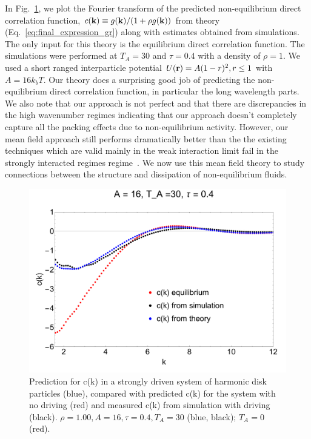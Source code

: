 \documentclass[amsmath,preprintnumbers,10pt,nofootinbib,prl,twocolumn]{revtex4-1}
\begin{document}
In Fig.~\ref{Fig:1}, we plot the Fourier transform of the predicted non-equilibrium direct correlation function, $c({\bf k})\equiv g({\bf k})/(1+\rho g({\bf k}))$ from theory (Eq.~\ref{eq:final_expression_gr}) along with estimates obtained from simulations. The only input for this theory is the equilibrium direct correlation function. The simulations were performed at $T_A=30$ and $\tau=0.4$ with a density of $\rho=1$. We used a short ranged interparticle potential $U({\bf r})=A (1- r)^2, r\leq 1$ with $A=16 k_b T$. Our theory does a surprising good job of predicting the non-equilibrium direct correlation function, in particular the long wavelength parts. We also note that our approach is not perfect and that there are discrepancies in the high wavenumber regimes indicating that our approach doesn't completely capture all the packing effects due to non-equilibrium activity. However, our mean field approach still performs dramatically better than the the existing techniques which are valid mainly in the weak interaction limit fail in the strongly interacted regimes regime~\cite{Dean_1996,Demery2011}. We now use this mean field theory to study connections between the structure and dissipation of non-equilibrium fluids. 
\begin{figure}
    \centering
    \includegraphics[scale=0.25, clip=True]{Ck_A16_T30_U0.4.pdf}
    \caption{Prediction for c(k) in a strongly driven system of harmonic disk particles (blue), compared with predicted c(k) for the system with no driving (red) and measured c(k) from simulation with driving (black). $\rho = 1.00, A = 16, \tau = 0.4, T_A = 30$ (blue, black); $T_A = 0$ (red).}
    \label{Fig:1}
\end{figure}
\end{document}
